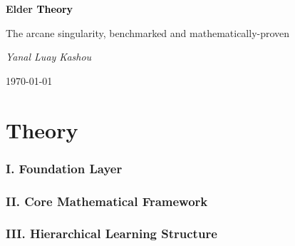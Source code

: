 \documentclass[11pt,twoside]{book}
\begin{document}
\frontmatter

\begin{titlepage}
    \centering
    \vspace*{2cm}
    {\Huge\bfseries \textcolor{DarkSkyBlue}{Elder }\textrm{\textcolor{black}{Theory}}\par}
    \vspace{2cm}
    {\Large The arcane singularity, benchmarked and mathematically-proven\par}
    \vspace{4cm}
    {\Large\itshape Yanal Luay Kashou\par}
    \vfill
    {\large \today\par}
\end{titlepage}

\tableofcontents

\mainmatter





\part{Theory}

\section*{I. Foundation Layer}

\section*{II. Core Mathematical Framework}

\section*{III. Hierarchical Learning Structure}
\end{document}

